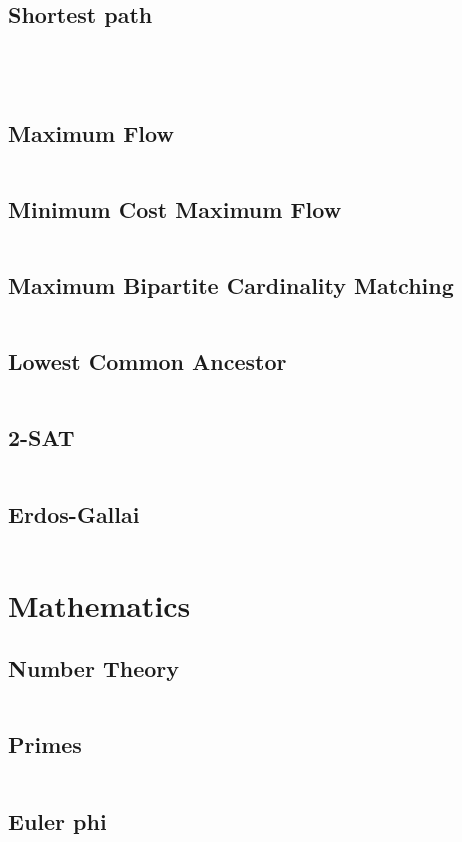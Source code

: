 \documentclass[a4paper, 10pt, twocolumn, landscape]{article}
\begin{document}
  \subsection{Shortest path}
  \inputminted{cpp}{graphs/dijkstra.cpp}
  \inputminted{cpp}{graphs/bellman-ford.cpp}
  \inputminted{cpp}{graphs/spfa.cpp}
  \inputminted{cpp}{graphs/floyd-warshall.cpp}
  \subsection{Maximum Flow}
  \inputminted{cpp}{graphs/dinic.cpp} %
  \subsection{Minimum Cost Maximum Flow}
  \inputminted{cpp}{graphs/min-cost-max-flow.cpp} %
  \subsection{Maximum Bipartite Cardinality Matching}
  \inputminted{cpp}{graphs/kuhn.cpp}
  \subsection{Lowest Common Ancestor}
  \inputminted{cpp}{graphs/lca.cpp}
  \subsection{2-SAT}
  \inputminted{cpp}{graphs/2-sat.cpp}
  \subsection{Erdos-Gallai}
  \inputminted{cpp}{graphs/erdos-gallai.cpp}

  \section{Mathematics}
  \subsection{Number Theory}
  \inputminted{cpp}{math/basics.cpp}
  \subsection{Primes}
  \inputminted{cpp}{math/sieve.cpp}
  \subsection{Euler phi}
  \inputminted{cpp}{math/euler-phi.cpp}
\end{document}
